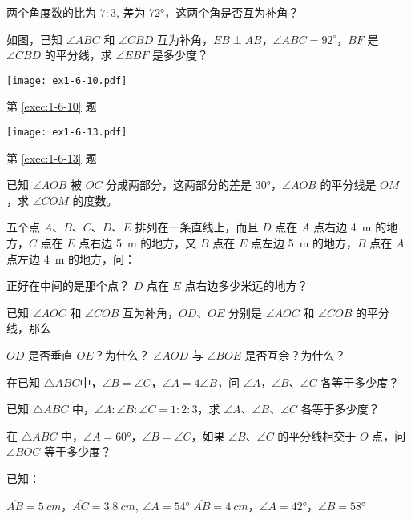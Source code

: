 \begin{Exercise}[复习题]
\begin{question}
	\item 两个角度数的比为 $7:3$, 差为 \ang{72}，这两个角是否互为补角？
  \item\label{exec:1-6-10} 如图，已知 $\angle ABC$ 和 $\angle CBD$ 互为补角，$EB\perp AB$，$\angle ABC=92^{\circ}$，$BF$ 是 $\angle CBD$ 的平分线，求 $\angle EBF$ 是多少度？
	\begin{figurehere}
		\begin{minipage}[b]{0.48\linewidth}\centering
			\texttt{[image: ex1-6-10.pdf]}
			\caption*{第 \ref{exec:1-6-10} 题}
		\end{minipage}
		\begin{minipage}[b]{0.48\linewidth}\centering
			\texttt{[image: ex1-6-13.pdf]}
			\caption*{第 \ref{exec:1-6-13} 题}
		\end{minipage}
	\end{figurehere}
	\item 已知 $\angle AOB$ 被 $OC$ 分成两部分，这两部分的差是 \ang{30}，$\angle AOB$ 的平分线是 $OM$，求 $\angle COM$ 的度数。
	\item 五个点 $A$、$B$、$C$、$D$、$E$ 排列在一条直线上，而且 $D$ 点在 $A$ 点右边 \qty{4}{m} 的地方，$C$ 点在 $E$ 点右边 \qty{5}{m} 的地方，又 $B$ 点在 $E$ 点左边 \qty{5}{m} 的地方，$B$ 点在 $A$ 点左边 \qty{4}{m} 的地方，问：
	\begin{tasks}
		\task 正好在中间的是那个点？
		\task $D$ 点在 $E$ 点右边多少米远的地方？
	\end{tasks}
	\item\label{exec:1-6-13} 已知 $\angle AOC$ 和 $\angle COB$ 互为补角，$OD$、$OE$ 分别是 $\angle AOC$ 和 $\angle COB$ 的平分线，那么
	\begin{tasks}
		\task $OD$ 是否垂直 $OE$？为什么？
		\task $\angle AOD$ 与 $\angle BOE$ 是否互余？为什么？
	\end{tasks}
	\item 在已知 $\triangle ABC$中，$\angle B=\angle C$，$\angle A=4\angle B$，问 $\angle A$，$\angle B$、$\angle C$ 各等于多少度？
	\item 已知 $\triangle ABC$ 中，$\angle A:\angle B:\angle C=1:2:3$，求 $\angle A$、$\angle B$、$\angle C$ 各等于多少度？
	\item 在 $\triangle ABC$ 中，$\angle A=\ang{60}$，$\angle B=\angle C$，如果 $\angle B$、$\angle C$ 的平分线相交于 $O$ 点，问 $\angle BOC$ 等于多少度？
	\item 已知：
	\begin{tasks}
		\task $\overline{AB}=\qty{5}{cm}$，$\overline{AC}=\qty{3.8}{cm}$, $\angle A=\ang{54}$
		\task $\overline{AB}=\qty{4}{cm}$，$\angle A=\ang{42}$，$\angle B=\ang{58}$

\end{tasks}
\end{question}
\end{Exercise}
